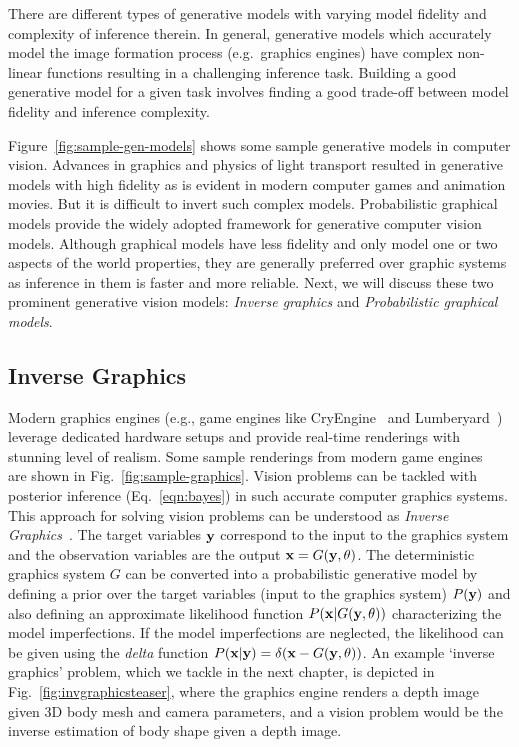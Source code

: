 There are different types of generative models with varying model fidelity and
complexity of inference therein. In general, generative models which accurately
model the image formation process (e.g.\ graphics engines) have complex
non-linear functions resulting in a challenging inference task. Building
a good generative model for a given task involves finding a good trade-off
between model fidelity and inference complexity.

Figure~\ref{fig:sample-gen-models} shows some sample generative models in computer vision.
Advances in graphics and physics of light transport resulted in generative models with
high fidelity as is evident in modern computer games and animation movies.
But it is difficult to invert such complex models.
Probabilistic graphical models provide the widely adopted framework
for generative computer vision models. Although graphical models have
less fidelity and only model one or two aspects of the world properties,
they are generally preferred over graphic systems as inference
in them is faster and more reliable. Next, we will discuss these two prominent
generative vision models: \textit{Inverse graphics} and
\textit{Probabilistic graphical models}.

\subsection{Inverse Graphics}
\label{sec:inv-graphics}

Modern graphics engines
(e.g., game engines like CryEngine~\cite{cryengine} and Lumberyard~\cite{lumberyard})
leverage dedicated hardware setups and
provide real-time renderings with stunning level of realism.
Some sample renderings from modern game engines~\cite{cryengine,lumberyard}
are shown in Fig.~\ref{fig:sample-graphics}.
Vision problems can be tackled with posterior
inference (Eq.~\ref{eqn:bayes}) in such accurate computer graphics systems.
This approach for solving vision problems can be understood as
\textit{Inverse Graphics}~\cite{baumgart1974inversegraphics}. The
target variables $\mathbf{y}$ correspond to the input to the graphics system and
the observation variables are the output $\mathbf{x}=G(\mathbf{y},\theta)$. The
deterministic graphics system $G$ can be converted into a probabilistic generative
model by defining a prior over the target variables (input to the graphics system) $P(\mathbf{y})$
and also defining an approximate likelihood function $P(\mathbf{x}|G(\mathbf{y},\theta))$
characterizing the model imperfections. If the model imperfections are neglected,
the likelihood can be given using the \emph{delta} function
$P(\mathbf{x}|\mathbf{y}) = \delta(\mathbf{x}-G(\mathbf{y},\theta))$.
An example `inverse graphics' problem, which we tackle in the next chapter,
is depicted in Fig.~\ref{fig:invgraphicsteaser},
where the graphics engine renders a depth image given 3D body mesh
and camera parameters, and a vision problem would be the inverse estimation
of body shape given a depth image.

